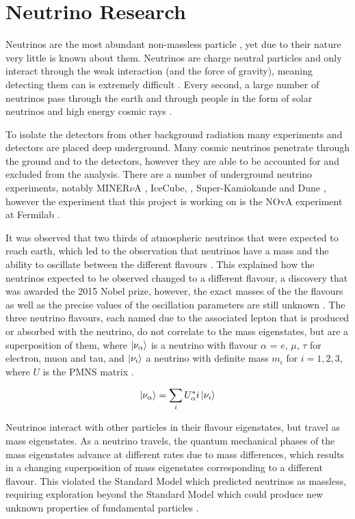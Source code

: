\onehalfspacing

\section{Neutrino Research}

\noindent Neutrinos are the most abundant non-massless particle \cite{Vitagliano}, yet due to their nature very little is known about them. Neutrinos are charge neutral particles and only interact through the weak interaction (and the force of gravity), meaning detecting them can is extremely difficult \cite{Maki}. Every second, a large number of neutrinos pass through the earth and through people in the form of solar neutrinos and high energy cosmic rays \cite{Szadowski}. \medskip

\noindent To isolate the detectors from other background radiation many experiments and detectors are placed deep underground. Many cosmic neutrinos penetrate through the ground and to the detectors, however they are able to be accounted for and excluded from the analysis. There are a number of underground neutrino experiments, notably MINER$\nu$A \cite{Perdue}, IceCube, \cite{Brenzke}, Super-Kamiokande \cite{Fukuda_1} and Dune \cite{Acciarri_1}, however the experiment that this project is working on is the NOvA experiment at Fermilab \cite{Aurisano}. \medskip

\noindent It was observed that two thirds of atmospheric neutrinos that were expected to reach earth, which led to the observation that neutrinos have a mass and the ability to oscillate between the different flavours \cite{Fukuda_2}. This explained how the neutrinos expected to be observed changed to a different flavour, a discovery that was awarded the 2015 Nobel prize, however, the exact masses of the the flavours as well as the precise values of the oscillation parameters are still unknown \cite{Capozzi}. The three neutrino flavours, each named due to the associated lepton that is produced or absorbed with the neutrino, do not correlate to the mass eigenstates, but are a superposition of them, where $\ket{\nu_\alpha}$ is a neutrino with flavour $\alpha$ = $e$, $\mu$, $\tau$ for electron, muon and tau, and $\ket{\nu_i}$  a neutrino with definite mass $m_i$ for $i =1,2,3$, where $U$ is the PMNS matrix \cite{Giganti}. \medskip

 \[\ket{\nu_\alpha} = \sum_{i}U^ {*}_\alpha i  \ket{\nu_i}\]

\noindent Neutrinos interact with other particles in their flavour eigenstates, but travel as mass eigenstates. As a neutrino travels, the quantum mechanical phases of the mass eigenstates advance at different rates due to mass differences, which results in a changing superposition of mass eigenstates corresponding to a different flavour. This violated the Standard Model which predicted neutrinos as massless, requiring exploration beyond the Standard Model which could produce new unknown properties of fundamental particles \cite{Sonneveld}. \medskip


